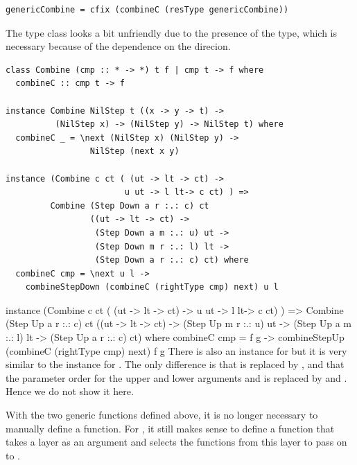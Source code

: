 \documentclass[preprint,natbib]{sigplanconf}
\begin{document}
\begin{small}
\begin{verbatim}
genericCombine = cfix (combineC (resType genericCombine))
\end{verbatim}%
\end{small}

The type class looks a bit unfriendly due to the presence of the  type, which is necessary because of the dependence on the direcion.

\begin{small}
\begin{verbatim}
class Combine (cmp :: * -> *) t f | cmp t -> f where
  combineC :: cmp t -> f

instance Combine NilStep t ((x -> y -> t) -> 
          (NilStep x) -> (NilStep y) -> NilStep t) where
  combineC _ = \next (NilStep x) (NilStep y) ->
                 NilStep (next x y) 
 
instance (Combine c ct ( (ut -> lt -> ct) ->
                        u ut -> l lt-> c ct) ) =>
         Combine (Step Down a r :.: c) ct
                 ((ut -> lt -> ct) ->
                  (Step Down a m :.: u) ut -> 
                  (Step Down m r :.: l) lt -> 
                  (Step Down a r :.: c) ct) where
  combineC cmp = \next u l ->
    combineStepDown (combineC (rightType cmp) next) u l
\end{verbatim}
\end{small}

\bc
instance (Combine c ct ( (ut -> lt -> ct) ->
                        u ut -> l lt-> c ct) ) =>
         Combine (Step Up a r :.: c) ct
                 ((ut -> lt -> ct) -> 
                  (Step Up m r :.: u) ut -> 
                  (Step Up a m :.: l) lt -> 
                  (Step Up a r :.: c) ct) where
  combineC cmp = \next f g ->
    combineStepUp (combineC (rightType cmp) next) f g
\ec
There is also an instance for  but it is very similar to the instance for . The only difference is that  is replaced by , and that the parameter order for the upper and lower arguments   and  is replaced by  and . Hence we do not show it here.





With the two generic functions defined above, it is no longer necessary to manually define a  function. For , it still makes sense to define a function that takes a layer as an argument and selects the functions from this layer to pass on to .
\end{document}
